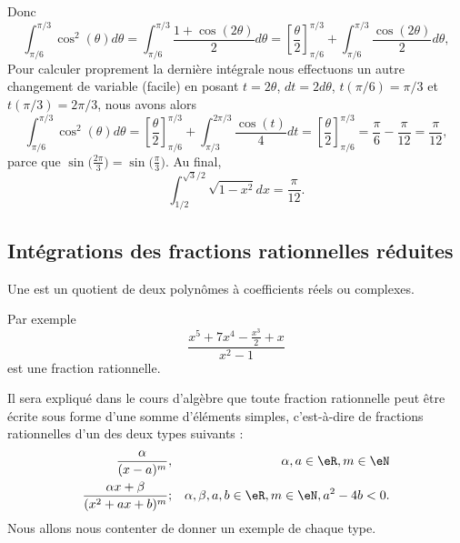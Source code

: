 \begin{example}
\begin{equation}
	\end{equation}
	Donc
	\begin{equation}
		\int_{\pi/6}^{\pi/3}\cos^2(\theta)d\theta=\int_{\pi/6}^{\pi/3}\frac{ 1+\cos(2\theta) }{2}d\theta=\left[ \frac{ \theta }{2}\right]_{\pi/6}^{\pi/3}+\int_{\pi/6}^{\pi/3}\frac{ \cos(2\theta) }{2}d\theta,
	\end{equation}
	Pour calculer proprement la dernière intégrale nous effectuons un autre changement de variable (facile) en posant \( t = 2\theta\), \( dt = 2 d\theta\), \( t(\pi/6) = \pi/3\) et \( t(\pi/3) = 2\pi/3\), nous avons alors
	\begin{equation}
		\int_{\pi/6}^{\pi/3}\cos^2(\theta)d\theta=\left[ \frac{ \theta }{2}\right]_{\pi/6}^{\pi/3}+\int_{\pi/3}^{2\pi/3}\frac{ \cos(t) }{4}dt  = \left[ \frac{ \theta }{2}\right]_{\pi/6}^{\pi/3}=\frac{ \pi }{ 6 }-\frac{ \pi }{ 12 }=\frac{ \pi }{ 12 },
	\end{equation}
	parce que \( \sin\big( \frac{ 2\pi }{ 3 } \big)=\sin\big( \frac{ \pi }{ 3 } \big)\). Au final,
	\begin{equation}
		\int_{1/2}^{\sqrt{3}/2}\sqrt{1-x^2}dx=\frac{ \pi }{ 12 }.
	\end{equation}
\end{example}

\subsection{Intégrations des fractions rationnelles réduites}

\begin{definition}
	Une  est un quotient de deux polynômes à coefficients réels ou complexes.
\end{definition}
Par exemple
\begin{equation}
	\frac{ x^5+7x^4-\frac{ x^3 }{2}+x }{ x^2-1 }
\end{equation}
est une fraction rationnelle.

Il sera expliqué dans le cours d'algèbre que toute fraction rationnelle peut être écrite sous forme d'une somme d'éléments simples, c'est-à-dire de fractions rationnelles d'un des deux types suivants :
\begin{subequations}
	\begin{align}
		\frac{ \alpha }{ (x-a)^m },              &  & \alpha,a\in \eR,m\in \eN  \label{CasMMIooZnZpUWi}                     \\
		\frac{ \alpha x+\beta }{ (x^2+ax+b)^m }; &  & \alpha, \beta ,a,b\in \eR,m\in \eN,a^2-4b<0. \label{CasMMIooZnZpUWii}
	\end{align}
\end{subequations}
Nous allons nous contenter de donner un exemple de chaque type.

